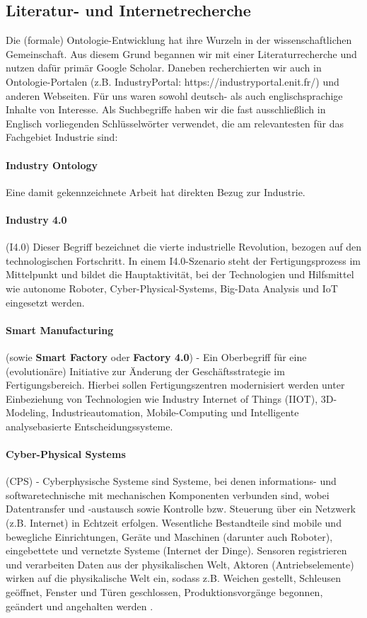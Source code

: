 \documentclass{article}
\begin{document}
\subsection{Literatur- und Internetrecherche}

Die (formale) Ontologie-Entwicklung hat ihre Wurzeln in der wissenschaftlichen Gemeinschaft.
Aus diesem Grund begannen wir mit einer Literaturrecherche und nutzen dafür primär Google Scholar.
Daneben recherchierten wir auch in Ontologie-Portalen (z.B. IndustryPortal: https://industryportal.enit.fr/) und anderen Webseiten.
Für uns waren sowohl deutsch- als auch englischsprachige Inhalte von Interesse.
Als Suchbegriffe haben wir die fast ausschließlich in Englisch vorliegenden Schlüsselwörter verwendet, die am relevantesten für das Fachgebiet Industrie sind:

\paragraph{Industry Ontology} Eine damit gekennzeichnete Arbeit hat direkten Bezug zur Industrie.

\paragraph{Industry 4.0} (I4.0) Dieser Begriff bezeichnet die vierte industrielle Revolution, bezogen auf den technologischen Fortschritt. In einem I4.0-Szenario steht der Fertigungsprozess im Mittelpunkt und bildet die Hauptaktivität, bei der Technologien und Hilfsmittel wie autonome Roboter, Cyber-Physical-Systems, Big-Data Analysis und IoT eingesetzt werden.

\paragraph{Smart Manufacturing} (sowie \textbf{Smart Factory} oder \textbf{Factory 4.0}) - Ein Oberbegriff für eine (evolutionäre) Initiative zur Änderung der Geschäftsstrategie im Fertigungsbereich. Hierbei sollen Fertigungszentren modernisiert werden unter Einbeziehung von Technologien wie Industry Internet of Things (IIOT), 3D-Modeling, Industrieautomation, Mobile-Computing und Intelligente analysebasierte Entscheidungssysteme.

\paragraph{Cyber-Physical Systems} (CPS) - Cyberphysische Systeme sind Systeme, bei denen informations- und softwaretechnische mit mechanischen Komponenten verbunden sind, wobei Datentransfer und -austausch sowie Kontrolle bzw. Steuerung über ein Netzwerk (z.B. Internet) in Echtzeit erfolgen. Wesentliche Bestandteile sind mobile und bewegliche Einrichtungen, Geräte und Maschinen (darunter auch Roboter), eingebettete und vernetzte Systeme (Internet der Dinge). Sensoren registrieren und verarbeiten Daten aus der physikalischen Welt, Aktoren (Antriebselemente) wirken auf die physikalische Welt ein, sodass z.B. Weichen gestellt, Schleusen geöffnet, Fenster und Türen geschlossen, Produktionsvorgänge begonnen, geändert und angehalten werden \cite{GablerCPS2024}.
\end{document}
